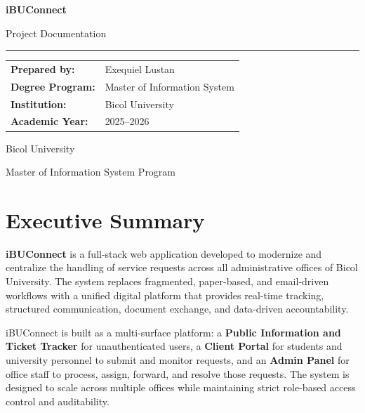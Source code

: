 \documentclass[12pt,a4paper]{article}
\begin{document}
\begin{titlepage}
    \centering
    \vspace*{2cm}
    {\Huge\bfseries\color{BUSlate} iBUConnect\par}
    \vspace{0.4cm}
    {\Large Project Documentation\par}
    \vspace{0.8cm}
    \rule{0.78\textwidth}{1pt}
    \vspace{1.2cm}

    \begin{tcolorbox}[width=0.78\textwidth,colback=white,colframe=BUBlue]
        \begin{tabularx}{\textwidth}{@{} l Y @{}}
            \textbf{Prepared by:} & Exequiel Lustan \\
            \textbf{Degree Program:} & Master of Information System \\
            \textbf{Institution:} & Bicol University \\
            \textbf{Academic Year:} & 2025--2026 \\
        \end{tabularx}
    \end{tcolorbox}

    \vfill
    {\large Bicol University\par}
    {\large Master of Information System Program\par}
\end{titlepage}

\tableofcontents
\newpage

\section{Executive Summary}

\textbf{iBUConnect} is a full-stack web application developed to modernize and centralize the handling of service requests across all administrative offices of Bicol University. The system replaces fragmented, paper-based, and email-driven workflows with a unified digital platform that provides real-time tracking, structured communication, document exchange, and data-driven accountability.

iBUConnect is built as a multi-surface platform: a \textbf{Public Information and Ticket Tracker} for unauthenticated users, a \textbf{Client Portal} for students and university personnel to submit and monitor requests, and an \textbf{Admin Panel} for office staff to process, assign, forward, and resolve those requests. The system is designed to scale across multiple offices while maintaining strict role-based access control and auditability.
\end{document}
